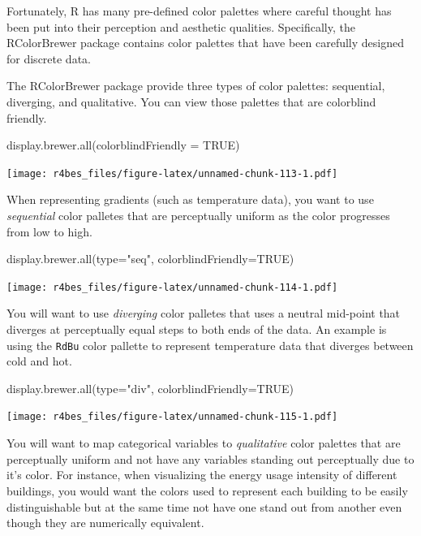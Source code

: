 \documentclass[
]{book}
\newenvironment{Shaded}{\begin{snugshade}}{\end{snugshade}}
\newcommand{\AttributeTok}[1]{\textcolor[rgb]{0.77,0.63,0.00}{#1}}
\newcommand{\ConstantTok}[1]{\textcolor[rgb]{0.00,0.00,0.00}{#1}}
\newcommand{\FunctionTok}[1]{\textcolor[rgb]{0.00,0.00,0.00}{#1}}
\newcommand{\NormalTok}[1]{#1}
\newcommand{\StringTok}[1]{\textcolor[rgb]{0.31,0.60,0.02}{#1}}
\begin{document}
Fortunately, R has many pre-defined color palettes where careful thought has been put into their perception and aesthetic qualities. Specifically, the RColorBrewer package contains color palettes that have been carefully designed for discrete data.

The RColorBrewer package provide three types of color palettes: sequential, diverging, and qualitative. You can view those palettes that are colorblind friendly.

\begin{Shaded}
\begin{Highlighting}[]
\FunctionTok{display.brewer.all}\NormalTok{(}\AttributeTok{colorblindFriendly =} \ConstantTok{TRUE}\NormalTok{)}
\end{Highlighting}
\end{Shaded}

\texttt{[image: r4bes\_files/figure-latex/unnamed-chunk-113-1.pdf]}

When representing gradients (such as temperature data), you want to use \emph{sequential} color palletes that are perceptually uniform as the color progresses from low to high.

\begin{Shaded}
\begin{Highlighting}[]
\FunctionTok{display.brewer.all}\NormalTok{(}\AttributeTok{type=}\StringTok{"seq"}\NormalTok{, }\AttributeTok{colorblindFriendly=}\ConstantTok{TRUE}\NormalTok{)}
\end{Highlighting}
\end{Shaded}

\texttt{[image: r4bes\_files/figure-latex/unnamed-chunk-114-1.pdf]}

You will want to use \emph{diverging} color palletes that uses a neutral mid-point that diverges at perceptually equal steps to both ends of the data. An example is using the \texttt{RdBu} color pallette to represent temperature data that diverges between cold and hot.

\begin{Shaded}
\begin{Highlighting}[]
\FunctionTok{display.brewer.all}\NormalTok{(}\AttributeTok{type=}\StringTok{"div"}\NormalTok{, }\AttributeTok{colorblindFriendly=}\ConstantTok{TRUE}\NormalTok{)}
\end{Highlighting}
\end{Shaded}

\texttt{[image: r4bes\_files/figure-latex/unnamed-chunk-115-1.pdf]}

You will want to map categorical variables to \emph{qualitative} color palettes that are perceptually uniform and not have any variables standing out perceptually due to it's color. For instance, when visualizing the energy usage intensity of different buildings, you would want the colors used to represent each building to be easily distinguishable but at the same time not have one stand out from another even though they are numerically equivalent.
\end{document}
